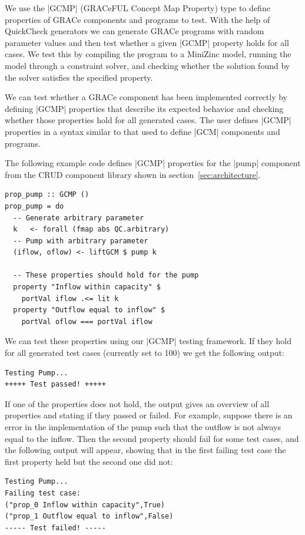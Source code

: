 \documentclass{article}
\begin{document}
We use the |GCMP| (GRACeFUL Concept Map Property) type to define properties of
GRACe components and programs to test.
%
With the help of QuickCheck generators we can generate GRACe programs with
random parameter values and then test whether a given |GCMP| property holds for all
cases.
%
We test this by compiling the program to a MiniZinc model, running the model through
a constraint solver, and checking whether the solution found by the solver
satisfies the specified property.

We can test whether a GRACe component has been implemented correctly
by defining |GCMP| properties that describe its expected behavior and checking whether
those properties hold for all generated cases.
%
The user defines |GCMP| properties in a syntax similar to that used to define |GCM|
components and programs.

The following example code defines |GCMP| properties for the |pump| component from
the CRUD component library shown in section~\ref{sec:architecture}.
\begin{verbatim}
prop_pump :: GCMP ()
prop_pump = do
  -- Generate arbitrary parameter
  k   <- forall (fmap abs QC.arbitrary)
  -- Pump with arbitrary parameter
  (iflow, oflow) <- liftGCM $ pump k

  -- These properties should hold for the pump
  property "Inflow within capacity" $
    portVal iflow .<= lit k
  property "Outflow equal to inflow" $
    portVal oflow === portVal iflow
\end{verbatim}

We can test these properties using our |GCMP| testing framework. If they hold for all
generated test cases (currently set to 100) we get the following output:
\begin{verbatim}
Testing Pump...
+++++ Test passed! +++++
\end{verbatim}

If one of the properties does not hold, the output gives an overview of all
properties and stating if they passed or failed.
%
For example, suppose there is an error in the implementation of the pump such
that the outflow is not always equal to the inflow. Then the second property
should fail for some test cases, and the following output will appear, showing
that in the first failing test case the first property held but the second one
did not:
\begin{verbatim}
Testing Pump...
Failing test case:
("prop_0 Inflow within capacity",True)
("prop_1 Outflow equal to inflow",False)
----- Test failed! -----
\end{verbatim}
\end{document}
